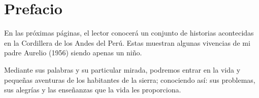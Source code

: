 \cleardoublepage
\newpage
\thispagestyle{empty}
\vfill


\chapter*{Prefacio} %

En las próximas páginas, el lector conocerá un conjunto de historias acontecidas en la Cordillera de los Andes del Perú. Estas muestran algunas vivencias de mi padre Aurelio (1956) siendo apenas un niño. %

Mediante sus palabras y su particular mirada, podremos entrar en la vida y pequeñas aventuras de los habitantes de la sierra; conociendo así: sus problemas, sus alegrías y las enseñanzas que la vida les proporciona.
\vfill

\newpage
\thispagestyle{empty}
